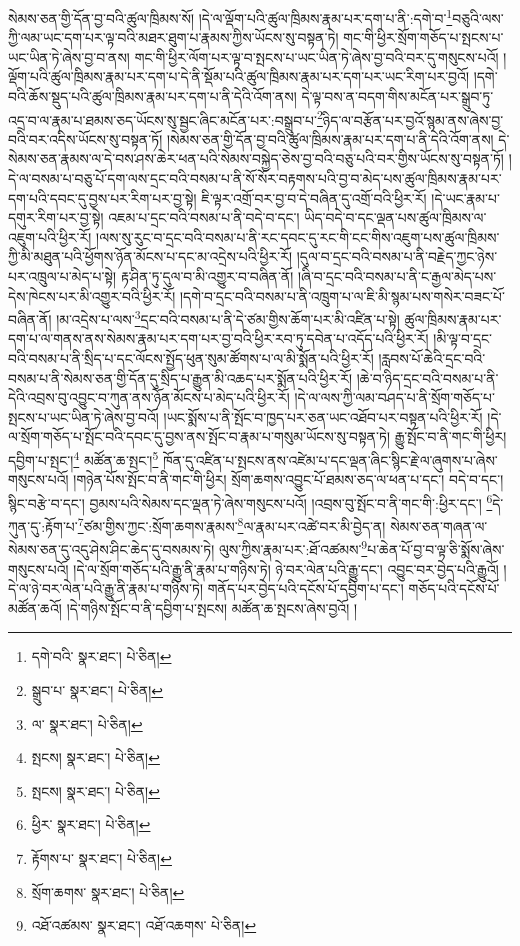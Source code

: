 སེམས་ཅན་གྱི་དོན་བྱ་བའི་ཚུལ་ཁྲིམས་སོ། །དེ་ལ་ལྡོག་པའི་ཚུལ་ཁྲིམས་རྣམ་པར་དག་པ་ནི་:དགེ་བ་\footnote{དགེ་བའི་  སྣར་ཐང་།  པེ་ཅིན། }བཅུའི་ལས་ཀྱི་ལམ་ཡང་དག་པར་ལྟ་བའི་མཐར་ཐུག་པ་རྣམས་ཀྱིས་ཡོངས་སུ་བསྟན་ཏེ། གང་གི་ཕྱིར་སྲོག་གཅོད་པ་སྤངས་པ་ཡང་ཡིན་ཏེ་ཞེས་བྱ་བ་ནས། གང་གི་ཕྱིར་ལོག་པར་ལྟ་བ་སྤངས་པ་ཡང་ཡིན་ཏེ་ཞེས་བྱ་བའི་བར་དུ་གསུངས་པའོ། །ལྡོག་པའི་ཚུལ་ཁྲིམས་རྣམ་པར་དག་པ་དེ་ནི་སྡོམ་པའི་ཚུལ་ཁྲིམས་རྣམ་པར་དག་པར་ཡང་རིག་པར་བྱའོ། །དགེ་བའི་ཆོས་སྡུད་པའི་ཚུལ་ཁྲིམས་རྣམ་པར་དག་པ་ནི་དེའི་འོག་ནས། དེ་ལྟ་བས་ན་བདག་གིས་མངོན་པར་སྒྲུབ་ཏུ་འདྲ་བ་ལ་རྣམ་པ་ཐམས་ཅད་ཡོངས་སུ་སྦྱང་ཞིང་མངོན་པར་:བསྒྲུབ་པ་\footnote{སྒྲུབ་པ་  སྣར་ཐང་།  པེ་ཅིན། }ཉིད་ལ་བརྩོན་པར་བྱའོ་སྙམ་ནས་ཞེས་བྱ་བའི་བར་འདིས་ཡོངས་སུ་བསྟན་ཏོ། །སེམས་ཅན་གྱི་དོན་བྱ་བའི་ཚུལ་ཁྲིམས་རྣམ་པར་དག་པ་ནི་དེའི་འོག་ནས། དེ་སེམས་ཅན་རྣམས་ལ་དེ་བས་ཤས་ཆེར་ཕན་པའི་སེམས་བསྐྱེད་ཅེས་བྱ་བའི་བཅུ་པའི་བར་གྱིས་ཡོངས་སུ་བསྟན་ཏོ། །དེ་ལ་བསམ་པ་བཅུ་པོ་དག་ལས་དྲང་བའི་བསམ་པ་ནི་སོ་སོར་བརྟགས་པའི་བྱ་བ་མེད་པས་ཚུལ་ཁྲིམས་རྣམ་པར་དག་པའི་དབང་དུ་བྱས་པར་རིག་པར་བྱ་སྟེ། ཇི་ལྟར་འགྲོ་བར་བྱ་བ་དེ་བཞིན་དུ་འགྲོ་བའི་ཕྱིར་རོ། །དེ་ཡང་རྣམ་པ་དགུར་རིག་པར་བྱ་སྟེ། འཇམ་པ་དྲང་བའི་བསམ་པ་ནི་བདེ་བ་དང་། ཡིད་བདེ་བ་དང་ལྡན་པས་ཚུལ་ཁྲིམས་ལ་འཇུག་པའི་ཕྱིར་རོ། །ལས་སུ་རུང་བ་དྲང་བའི་བསམ་པ་ནི་རང་དབང་དུ་རང་གི་ངང་གིས་འཇུག་པས་ཚུལ་ཁྲིམས་ཀྱི་མི་མཐུན་པའི་ཕྱོགས་ཉོན་མོངས་པ་དང་མ་འདྲེས་པའི་ཕྱིར་རོ། །དུལ་བ་དྲང་བའི་བསམ་པ་ནི་བརྗེད་ཀྱང་ཉེས་པར་འཁྲུལ་པ་མེད་པ་སྟེ། རྟ་ཤིན་ཏུ་དུལ་བ་མི་འགྱུར་བ་བཞིན་ནོ། །ཞི་བ་དྲང་བའི་བསམ་པ་ནི་ང་རྒྱལ་མེད་པས་དེས་ཁེངས་པར་མི་འགྱུར་བའི་ཕྱིར་རོ། །དགེ་བ་དྲང་བའི་བསམ་པ་ནི་འཁྲུག་པ་ལ་ཇི་མི་སྙམ་པས་གསེར་བཟང་པོ་བཞིན་ནོ། །མ་འདྲེས་པ་ལས་\footnote{ལ་  སྣར་ཐང་།  པེ་ཅིན། }དྲང་བའི་བསམ་པ་ནི་དེ་ཙམ་གྱིས་ཆོག་པར་མི་འཛིན་པ་སྟེ། ཚུལ་ཁྲིམས་རྣམ་པར་དག་པ་ལ་གནས་ནས་སེམས་རྣམ་པར་དག་པར་བྱ་བའི་ཕྱིར་རབ་ཏུ་དབེན་པ་འདོད་པའི་ཕྱིར་རོ། །མི་ལྟ་བ་དྲང་བའི་བསམ་པ་ནི་སྲིད་པ་དང་ལོངས་སྤྱོད་ཕུན་སུམ་ཚོགས་པ་ལ་མི་སྨོན་པའི་ཕྱིར་རོ། །རླབས་པོ་ཆེའི་དྲང་བའི་བསམ་པ་ནི་སེམས་ཅན་གྱི་དོན་དུ་སྲིད་པ་རྒྱུན་མི་འཆད་པར་སྨོན་པའི་ཕྱིར་རོ། །ཆེ་བ་ཉིད་དྲང་བའི་བསམ་པ་ནི་དེའི་འབྲས་བུ་འབྱུང་བ་ཀུན་ནས་ཉོན་མོངས་པ་མེད་པའི་ཕྱིར་རོ། །དེ་ལ་ལས་ཀྱི་ལམ་བཤད་པ་ནི་སྲོག་གཅོད་པ་སྤངས་པ་ཡང་ཡིན་ཏེ་ཞེས་བྱ་བའོ། །ཡང་སྨོས་པ་ནི་སྤོང་བ་ཁྱད་པར་ཅན་ཡང་འཐོབ་པར་བསྟན་པའི་ཕྱིར་རོ། །དེ་ལ་སྲོག་གཅོད་པ་སྤོང་བའི་དབང་དུ་བྱས་ནས་སྤོང་བ་རྣམ་པ་གསུམ་ཡོངས་སུ་བསྟན་ཏེ། རྒྱུ་སྤོང་བ་ནི་གང་གི་ཕྱིར། དབྱིག་པ་སྤང་།\footnote{སྤངས།  སྣར་ཐང་།  པེ་ཅིན། } མཚོན་ཆ་སྤང་།\footnote{སྤངས།  སྣར་ཐང་།  པེ་ཅིན། } ཁོན་དུ་འཛིན་པ་སྤངས་ནས་འཛེམ་པ་དང་ལྡན་ཞིང་སྙིང་རྗེ་ལ་ཞུགས་པ་ཞེས་གསུངས་པའོ། །གཉེན་པོས་སྤོང་བ་ནི་གང་གི་ཕྱིར། སྲོག་ཆགས་འབྱུང་པོ་ཐམས་ཅད་ལ་ཕན་པ་དང་། བདེ་བ་དང་། སྙིང་བརྩེ་བ་དང་། བྱམས་པའི་སེམས་དང་ལྡན་ཏེ་ཞེས་གསུངས་པའོ། །འབྲས་བུ་སྤོང་བ་ནི་གང་གི་:ཕྱིར་དང་། \footnote{ཕྱིར་  སྣར་ཐང་།  པེ་ཅིན། }དེ་ཀུན་དུ་:རྟོག་པ་\footnote{རྟོགས་པ་  སྣར་ཐང་།  པེ་ཅིན། }ཙམ་གྱིས་ཀྱང་:སྲོག་ཆགས་རྣམས་\footnote{སྲོག་ཆགས་  སྣར་ཐང་།  པེ་ཅིན། }ལ་རྣམ་པར་འཚེ་བར་མི་བྱེད་ན། སེམས་ཅན་གཞན་ལ་སེམས་ཅན་དུ་འདུ་ཤེས་ཤིང་ཆེད་དུ་བསམས་ཏེ། ལུས་ཀྱིས་རྣམ་པར་:ཐོ་འཚམས་\footnote{འཐོ་འཚམས་  སྣར་ཐང་། འཐོ་འཆགས་  པེ་ཅིན། }པ་ཆེན་པོ་བྱ་བ་ལྟ་ཅི་སྨོས་ཞེས་གསུངས་པའོ། །དེ་ལ་སྲོག་གཅོད་པའི་རྒྱུ་ནི་རྣམ་པ་གཉིས་ཏེ། ཉེ་བར་ལེན་པའི་རྒྱུ་དང་། འབྱུང་བར་བྱེད་པའི་རྒྱུའོ། །དེ་ལ་ཉེ་བར་ལེན་པའི་རྒྱུ་ནི་རྣམ་པ་གཉིས་ཏེ། གནོད་པར་བྱེད་པའི་དངོས་པོ་དབྱིག་པ་དང་། གཅོད་པའི་དངོས་པོ་མཚོན་ཆའོ། །དེ་གཉིས་སྤོང་བ་ནི་དབྱིག་པ་སྤངས། མཚོན་ཆ་སྤངས་ཞེས་བྱའོ། །
